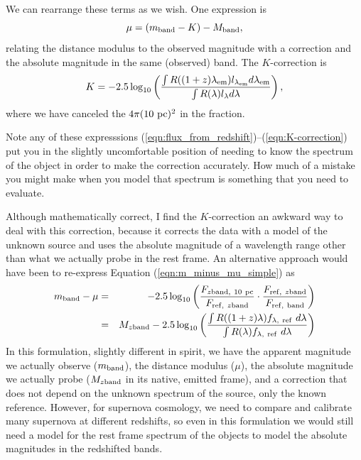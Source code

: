 We can rearrange these terms as we wish.  One expression is 
\begin{equation}
  \mu  =  (m_{\rm band} - K) - M_{\rm band},
\end{equation}
relating the distance modulus to the observed magnitude with a correction and the absolute magnitude in the same (observed) band.  The 
 $K$-correction is
\begin{equation}
  K = -2.5 \log_{10} \left(  \frac{\int R((1+z)\lambda_{\rm em}) l_{\lambda_{\rm em}} d\lambda_{\rm em}}{\int R(\lambda) l_\lambda d\lambda} \right), \label{eqn:K-correction}
\end{equation}
where we have canceled the $4\pi(10\ {\rm pc})^2$ in the fraction.

Note any of these expresssions (\ref{eqn:flux_from_redshift})--(\ref{eqn:K-correction}) put you in the slightly uncomfortable position of needing to know the spectrum of the object in order to make the correction accurately.  How much of a mistake you might make when you model that spectrum is something that you need to evaluate. 

Although mathematically correct, I find the $K$-correction an awkward way to deal with this correction, because it corrects the data with a model of the unknown source and uses the absolute magnitude of a wavelength range other than what we actually probe in the rest frame.  An alternative approach would have been to re-express Equation (\ref{eqn:m_minus_mu_simple}) as
\begin{eqnarray}
  m_{\rm band} - \mu &=& -2.5 \log_{10} \left(\frac{F_{z\rm band,\ 10\ pc}}{F_{{\rm ref},\ z{\rm band}}}\cdot \frac{F_{{\rm ref},\ z{\rm band}}}{F_{\rm ref,\  band}} \right) \\
   &=& M_{z \rm band} - 2.5 \log_{10} \left( \frac{\int R((1+z)\lambda) f_{\lambda,\ \rm ref}\ d\lambda}{\int R(\lambda) f_{\lambda,\ \rm ref}\ d\lambda} \right) \label{eqn:alternative_to_K_correction}
\end{eqnarray}
In this formulation, slightly different in spirit, we have the apparent magnitude we actually observe ($m_{\rm band}$), the distance modulus ($\mu$), the absolute magnitude we actually probe ($M_{z\rm band}$ in its native, emitted frame), and a correction that does not depend on the unknown spectrum of the source, only the known reference.  However, for supernova cosmology, we need to compare and calibrate many supernova at different redshifts, so even in this formulation we would still need a model for the rest frame spectrum of the objects to model the absolute magnitudes in the redshifted bands.
 
